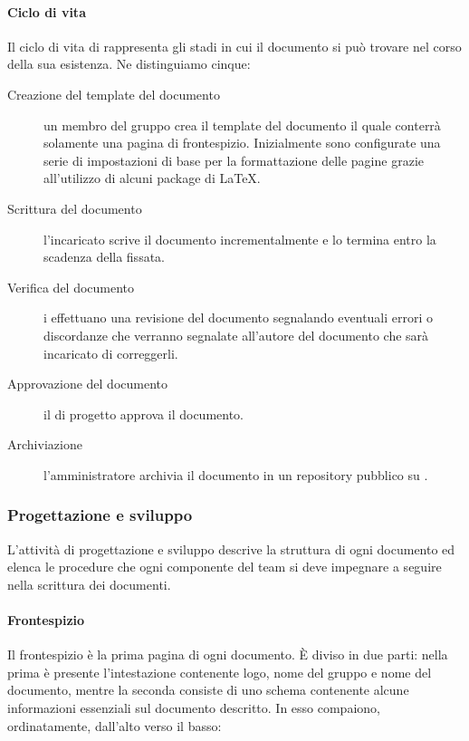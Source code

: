 \documentclass[../../norme-di-progetto.tex]{subfiles}
\begin{document}
\paragraph{Ciclo di vita}%
\label{par:ciclo_di_vita}
Il ciclo di vita di rappresenta gli stadi in cui il documento si può trovare nel corso della sua esistenza. Ne distinguiamo cinque:

\begin{description}
  \item [Creazione del template del documento] un membro del gruppo crea il template del documento il quale conterrà solamente una pagina di frontespizio. Inizialmente sono configurate una serie di impostazioni di base per la formattazione delle pagine grazie all'utilizzo di alcuni package di \LaTeX.
  \item [Scrittura del documento] l'incaricato scrive il documento incrementalmente e lo termina entro la scadenza della  fissata.
  \item [Verifica del documento] i  effettuano una revisione del documento segnalando eventuali errori o discordanze che verranno segnalate all'autore del documento che sarà incaricato di correggerli.
  \item [Approvazione del documento] il  di progetto approva il documento.
  \item [Archiviazione] l'amministratore archivia il documento in un repository pubblico su .
\end{description}

\subsubsection{Progettazione e sviluppo}%
\label{subs:progettazione_e_sviluppo}

L'attività di progettazione e sviluppo descrive la struttura di ogni documento ed elenca le procedure che ogni componente del team si deve impegnare a seguire nella scrittura dei documenti.

\paragraph{Frontespizio}%
\label{par:frontespizio}
Il frontespizio è la prima pagina di ogni documento. È diviso in due parti: nella prima è presente l'intestazione contenente logo, nome del gruppo e nome del documento, mentre la seconda consiste di uno schema contenente alcune informazioni essenziali sul documento descritto. In esso compaiono, ordinatamente, dall'alto verso il basso:
\end{document}

